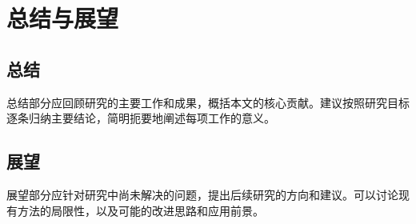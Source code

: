 \chapter{总结与展望}\label{sec:conclusion}

\section{总结}

总结部分应回顾研究的主要工作和成果，概括本文的核心贡献。建议按照研究目标逐条归纳主要结论，简明扼要地阐述每项工作的意义。

\section{展望}

展望部分应针对研究中尚未解决的问题，提出后续研究的方向和建议。可以讨论现有方法的局限性，以及可能的改进思路和应用前景。
